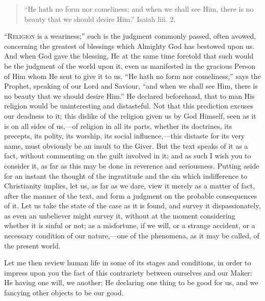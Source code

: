 
\begin{quote}

``He hath no form nor comeliness; and when we shall see Him,
there is no beauty that we should desire Him.'' Isaiah liii. 2.

\end{quote}

``R\textsc{eligion} is a weariness;'' such is the judgment commonly
passed, often avowed, concerning the greatest of blessings which
Almighty God has bestowed upon us. And when God gave the blessing, He
at the same time foretold that such would be the judgment of the world
upon it, even as manifested in the gracious Person of Him whom He sent
to give it to us. ``He hath no form nor comeliness,'' says the
Prophet, speaking of our Lord and Saviour, ``and when we shall see
Him, there is no beauty that we should desire Him.'' He declared
beforehand, that to man His religion would be uninteresting and
distasteful. Not that this prediction excuses our deadness to it; this
dislike of the religion given us by God Himself, seen as it is on all
sides of us,—of religion in all its parts, whether its doctrines, its
precepts, its polity, its worship, its social influence,—this
distaste for its very name, must obviously be an insult to the Giver.
But the text speaks of it as a fact, without commenting on the guilt
involved in it; and as such I wish you to consider it, as far as this
may be done in reverence and seriousness. Putting aside for an instant
the thought of the ingratitude and the sin which indifference to
Christianity implies, let us, as far as we dare, view it merely as a
matter of fact, after the manner of the text, and form a judgment on
the probable consequences of it. Let us take the state of the case as
it is found, and survey it dispassionately, as even an unbeliever
might survey it, without at the moment considering whether it is
sinful or not; as a misfortune, if we will, or a strange accident, or
a necessary condition of our nature,—one of the phenomena, as it may
be called, of the present world.

Let me then review human life in some of its stages and conditions,
in order to impress upon you the fact of this contrariety between
ourselves and our Maker: He having one will, we another; He declaring
one thing to be good for us, and we fancying other objects to be our
good.

